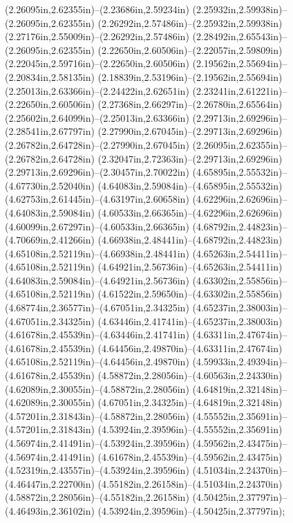 (2.26095in,2.62355in)--(2.23686in,2.59234in) (2.25932in,2.59938in)--(2.26095in,2.62355in) (2.26292in,2.57486in)--(2.25932in,2.59938in) (2.27176in,2.55009in)--(2.26292in,2.57486in) (2.28492in,2.65543in)--(2.26095in,2.62355in) (2.22650in,2.60506in)--(2.22057in,2.59809in) (2.22045in,2.59716in)--(2.22650in,2.60506in) (2.19562in,2.55694in)--(2.20834in,2.58135in) (2.18839in,2.53196in)--(2.19562in,2.55694in) (2.25013in,2.63366in)--(2.24422in,2.62651in) (2.23241in,2.61221in)--(2.22650in,2.60506in) (2.27368in,2.66297in)--(2.26780in,2.65564in) (2.25602in,2.64099in)--(2.25013in,2.63366in) (2.29713in,2.69296in)--(2.28541in,2.67797in) (2.27990in,2.67045in)--(2.29713in,2.69296in) (2.26782in,2.64728in)--(2.27990in,2.67045in) (2.26095in,2.62355in)--(2.26782in,2.64728in) (2.32047in,2.72363in)--(2.29713in,2.69296in) (2.29713in,2.69296in)--(2.30457in,2.70022in) (4.65895in,2.55532in)--(4.67730in,2.52040in) (4.64083in,2.59084in)--(4.65895in,2.55532in) (4.62753in,2.61445in)--(4.63197in,2.60658in) (4.62296in,2.62696in)--(4.64083in,2.59084in) (4.60533in,2.66365in)--(4.62296in,2.62696in) (4.60099in,2.67297in)--(4.60533in,2.66365in) (4.68792in,2.44823in)--(4.70669in,2.41266in) (4.66938in,2.48441in)--(4.68792in,2.44823in) (4.65108in,2.52119in)--(4.66938in,2.48441in) (4.65263in,2.54411in)--(4.65108in,2.52119in) (4.64921in,2.56736in)--(4.65263in,2.54411in) (4.64083in,2.59084in)--(4.64921in,2.56736in) (4.63302in,2.55856in)--(4.65108in,2.52119in) (4.61522in,2.59650in)--(4.63302in,2.55856in) (4.68774in,2.36577in)--(4.67051in,2.34325in) (4.65237in,2.38003in)--(4.67051in,2.34325in) (4.63446in,2.41741in)--(4.65237in,2.38003in) (4.61678in,2.45539in)--(4.63446in,2.41741in) (4.63311in,2.47674in)--(4.61678in,2.45539in) (4.64456in,2.49870in)--(4.63311in,2.47674in) (4.65108in,2.52119in)--(4.64456in,2.49870in) (4.59933in,2.49394in)--(4.61678in,2.45539in) (4.58872in,2.28056in)--(4.60563in,2.24330in) (4.62089in,2.30055in)--(4.58872in,2.28056in) (4.64819in,2.32148in)--(4.62089in,2.30055in) (4.67051in,2.34325in)--(4.64819in,2.32148in) (4.57201in,2.31843in)--(4.58872in,2.28056in) (4.55552in,2.35691in)--(4.57201in,2.31843in) (4.53924in,2.39596in)--(4.55552in,2.35691in) (4.56974in,2.41491in)--(4.53924in,2.39596in) (4.59562in,2.43475in)--(4.56974in,2.41491in) (4.61678in,2.45539in)--(4.59562in,2.43475in) (4.52319in,2.43557in)--(4.53924in,2.39596in) (4.51034in,2.24370in)--(4.46447in,2.22700in) (4.55182in,2.26158in)--(4.51034in,2.24370in) (4.58872in,2.28056in)--(4.55182in,2.26158in) (4.50425in,2.37797in)--(4.46493in,2.36102in) (4.53924in,2.39596in)--(4.50425in,2.37797in);
